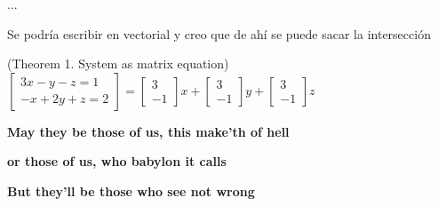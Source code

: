 \documentclass[12pt,oneside]{book}
\begin{document}
...

Se podría escribir en vectorial y creo que de ahí se puede sacar la intersección

\def\theorem{1cm}
\begin{center}\vspace{\theorem}\big(Theorem 1. System as matrix equation\big)
  \large\(
    \begin{bmatrix}
      3x-y-z = 1 \\
      -x+2y+z = 2
    \end{bmatrix}
    = \begin{bmatrix} 3\\ -1 \end{bmatrix} x
    + \begin{bmatrix} 3\\ -1 \end{bmatrix} y
    + \begin{bmatrix} 3\\ -1 \end{bmatrix} z
    \)
\normalsize\end{center}

\textbf{May they be those of us, this make'th of hell}

\textbf{or those of us, who babylon it calls}

\textbf{But they'll be those who see not wrong}

\textbf{}






  \printbibliography[title={Bibliografía},heading=bibintoc]
\end{document}

